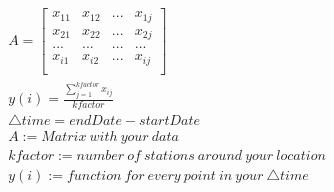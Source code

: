 \documentclass[letterpaper,10pt,english]{sphinxmanual}
\begin{document}
\sphinxAtStartPar
{}
\begin{equation*}
\begin{split}\begin{eqnarray}
     A =
     \left[ \begin{array}{rrr}
     x_{11} & x_{12} & ... & x_{1j}\\
     x_{21} & x_{22} & ... & x_{2j}\\
     ...    & ... & ...    & ...   \\
     x_{i1} & x_{i2} & ... & x_{ij} \\
     \end{array}\right]\\
     y(i) = \frac{\displaystyle\sum\limits_{j=1}^{kfactor} x_{ij}}{kfactor}\\
     \triangle time = endDate - startDate\\
     A:= Matrix \ with \ your \ data \\
     kfactor := number \ of \ stations \ around \ your \ location\\
     y(i) := function \ for \ every \ point \ in \ your \  \triangle time \\
 \end{eqnarray}\end{split}
\end{equation*}
\sphinxAtStartPar
{}
\end{document}
